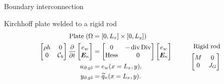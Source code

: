 \documentclass[aspectratio=169]{ISAE-Beamer}
\DeclareMathOperator*{\Div}{Div}
\renewcommand{\div}{\operatorname{div}}
\DeclareMathOperator*{\Hess}{Hess}
\begin{document}
\begin{frame}{Boundary interconnection}

\end{frame}

\begin{frame}{Kirchhoff plate welded to a rigid rod}
\begin{equation*}\small
\begin{aligned}
\text{Plate} \; (\Omega &= [0, L_x] \times [0, L_y]) \\
\begin{bmatrix}
\rho h & 0 \\ 0 & \mathcal{\bm{C}}_b \\
\end{bmatrix}
\diffp{}{t}
\begin{bmatrix}
{e}_w \\ \bm{E}_\kappa \\
\end{bmatrix} &= 
\begin{bmatrix}
0 & -\div\Div \\ \Hess & 0 \\
\end{bmatrix}
\begin{bmatrix}
{e}_w \\ \bm{E}_\kappa \\
\end{bmatrix} \\
u_{\partial, \text{pl}} &= {e}_w (x = L_x, y), \\
y_{\partial, \text{pl}} &= \widetilde{q}_n(x = L_x, y).
\end{aligned} \qquad \quad
\begin{aligned}
\text{Rigid rod} \\
\begin{bmatrix}
M & 0 \\
0   & J_G \\
\end{bmatrix} 

\end{aligned}
\end{equation*}
\end{frame}
\end{document}
